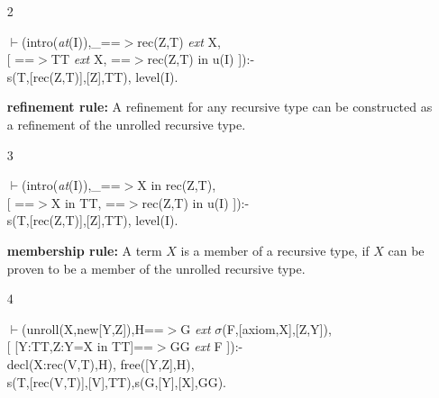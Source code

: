 \documentclass[11pt]{report}
\begin{document}
 \begin{enumerate}
 \item[2]
\begin{sf}\begin{tabbing}
$\vdash$(intro(\mbox{\it at}(I)),\_\hspace{0.1em}==$>$rec(Z,T) \mbox{\it ext} X, \\[-0.15ex]
\hspace{2em}[ ==$>$TT \mbox{\it ext} X, ==$>$rec(Z,T) in u(I) ]):-\\[-0.15ex]
\hspace{2em}s(T,[rec(Z,T)],[Z],TT), level(I).
\end{tabbing}\end{sf}

 {\bf refinement rule:}
 A refinement for any recursive type can be constructed
 as a refinement of the unrolled recursive type. 
 \item[3]
\begin{sf}\begin{tabbing}
$\vdash$(intro(\mbox{\it at}(I)),\_\hspace{0.1em}==$>$X in rec(Z,T), \\[-0.15ex]
\hspace{2em}[ ==$>$X in TT, ==$>$rec(Z,T) in u(I) ]):-\\[-0.15ex]
\hspace{2em}s(T,[rec(Z,T)],[Z],TT), level(I).
\end{tabbing}\end{sf}

 {\bf membership rule:}
 A term $X$ is a member of a recursive type, if $X$ can be
 proven to be a member of the unrolled recursive type. 
 \item[4]
\begin{sf}\begin{tabbing}
$\vdash$(unroll(X,new[Y,Z]),H==$>$G \mbox{\it ext} $\sigma$(F,[axiom,X],[Z,Y]), \\[-0.15ex]
\hspace{2em}[ [Y:TT,Z:Y=X in TT]==$>$GG \mbox{\it ext} F ]):-\\[-0.15ex]
\hspace{2em}decl(X:rec(V,T),H), free([Y,Z],H),\\[-0.15ex]
\hspace{2em}s(T,[rec(V,T)],[V],TT),s(G,[Y],[X],GG).
\end{tabbing}\end{sf}


\end{enumerate}
\end{document}
